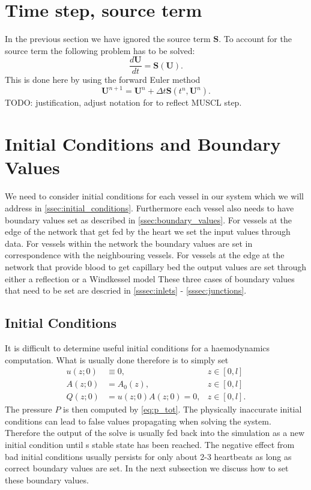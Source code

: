 \documentclass[a4paper, oneside]{discothesis}
\begin{document}
	\section{Time step, source term} \label{sec:fe}
	In the previous section we have ignored the source term $\mathbf{S}$.
	To account for the source term the following problem has to be solved:
	\begin{equation}
		\frac{d \mathbf{U}}{d t}=\mathbf{S}(\mathbf{U}) .
	\end{equation}
	This is done here by using the forward Euler method
	\begin{equation}
		\mathbf{U}^{n+1}=\mathbf{U}^n + \Delta t \mathbf{S}\left(t^n, \mathbf{U}^n\right).
	\end{equation}
	TODO: justification, adjust notation for to reflect MUSCL step.


	\section{Initial Conditions and Boundary Values} \label{sec:icbc}
	We need to consider initial conditions for each vessel in our system which we will address in \autoref{ssec:initial_conditions}.
	Furthermore each vessel also needs to have boundary values set as described in \autoref{ssec:boundary_values}.
	For vessels at the edge of the network that get fed by the heart we set the input values through data.
	For vessels within the network the boundary values are set in correspondence with the neighbouring vessels.
	For vessels at the edge at the network that provide blood to get capillary bed the output values are set through either a reflection or a Windkessel model
	These three cases of boundary values that need to be set are descried in \autoref{sssec:inlets} - \autoref{sssec:junctions}.
	\subsection{Initial Conditions} \label{ssec:initial_conditions}
	It is difficult to determine useful initial conditions for a haemodynamics computation.
	What is usually done therefore is to simply set
	\begin{align}
		u(z;0) &\equiv 0, &z \in [0,l]\\
		A(z;0) &= A_0(z), &z \in [0,l] \\
		Q(z;0) &= u(z;0)A(z;0) = 0, &z \in [0,l].
	\end{align}
	The pressure $P$ is then computed by \autoref{eq:p_tot}.
	The physically inaccurate initial conditions can lead to false values propagating when solving the system.
	Therefore the output of the solve is usually fed back into the simulation as a new initial condition until s stable state has been reached.
	The negative effect from bad initial conditions usually persists for only about 2-3 heartbeats as long as correct boundary values are set.\cite{formaggia2010cardiovascular}
	In the next subsection we discuss how to set these boundary values. 
\end{document}
